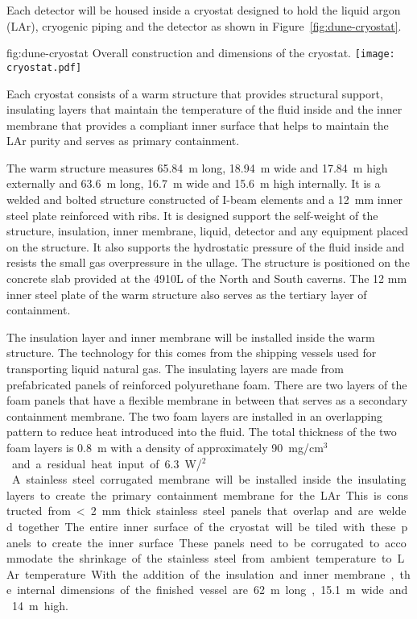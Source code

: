 Each detector will be housed inside a cryostat designed to hold the
liquid argon (LAr), cryogenic piping and the detector as shown in
Figure~\ref{fig:dune-cryostat}.
\begin{dunefigure}{fig:dune-cryostat}
  {Overall construction and dimensions of the  cryostat.}
  \texttt{[image: cryostat.pdf]}
\end{dunefigure}
Each cryostat consists of a warm structure that provides structural
support, insulating layers that maintain the temperature of the fluid
inside and the inner membrane that provides a compliant inner surface
that helps to maintain the LAr purity and serves as primary
containment.

The warm structure measures \SI{65.84}{\meter} long,
\SI{18.94}{\meter} wide and \SI{17.84}{\meter} high externally and
\SI{63.6}{\meter} long, \SI{16.7}{\meter} wide and \SI{15.6}{\meter}
high internally.  It is a welded and bolted structure constructed of
I-beam elements and a \SI{12}{\mm} inner steel plate reinforced with
ribs.  It is designed support the self-weight of the structure,
insulation, inner membrane, liquid, detector and any equipment placed
on the structure.  It also supports the hydrostatic pressure of the
fluid inside and resists the small gas overpressure in the ullage.
The structure is positioned on the concrete slab provided at the 4910L
of the North and South caverns.  The 12 mm inner steel plate of the
warm structure also serves as the tertiary layer of containment.

The insulation layer and inner membrane will be installed inside the
warm structure.  The technology for this comes from the shipping
vessels used for transporting liquid natural gas. The insulating
layers are made from prefabricated panels of reinforced polyurethane
foam.  There are two layers of the foam panels that have a flexible
membrane in between that serves as a secondary containment membrane.
The two foam layers are installed in an overlapping pattern to reduce
heat introduced into the fluid.  The total thickness of the two foam
layers is \SI{0.8}{\meter} with a density of approximately
\SI{90}{mg/cm$^3$} and a residual heat input of
\SI{6.3}{W/\meter$^2$}.  A stainless steel corrugated membrane will be
installed inside the insulating layers to create the primary
containment membrane for the LAr.  This is constructed from < 2 mm
thick stainless steel panels that overlap and are welded together.
The entire inner surface of the cryostat will be tiled with these
panels to create the inner surface.  These panels need to be
corrugated to accommodate the shrinkage of the stainless steel from
ambient temperature to LAr temperature.  With the addition of the
insulation and inner membrane, the internal dimensions of the finished
vessel are \SI{62}{\meter} long, \SI{15.1}{\meter} wide and
\SI{14}{\meter} high.

